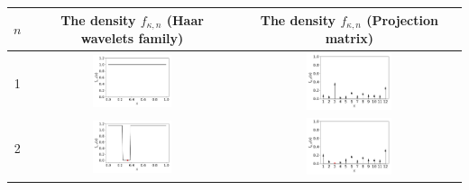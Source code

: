 \documentclass[twoside,11pt]{book}
\numberwithin{theorem}{chapter}
\numberwithin{definition}{chapter}
\numberwithin{proposition}{chapter}
\numberwithin{corollary}{chapter}
\numberwithin{example}{chapter}
\numberwithin{lemma}{chapter}
\numberwithin{assumption}{chapter}
\begin{document}
\begin{table}[]
\centering
 \begin{tabular}{| c| c| c|}
 \hline
  $n $ & The density $f_{\kappa,n}$ (Haar wavelets family) & The density $f_{\kappa,n}$ (Projection matrix)\\
 \hline
 1 & \includegraphics[width= 0.4\textwidth, height = 0.16\textheight]{img/Haar/haar_Ensemble_1D_conditional_N_0.pdf} & \includegraphics[width= 0.4\textwidth, height = 0.16\textheight]{img/discrete/discrete_Ensemble_1D_conditional_N_0.pdf}\\ 
 \hline
2 & \includegraphics[width= 0.4\textwidth, height = 0.16\textheight]{img/Haar/haar_Ensemble_1D_conditional_N_1.pdf} & \includegraphics[width= 0.4\textwidth, height = 0.16\textheight]{img/discrete/discrete_Ensemble_1D_conditional_N_1.pdf}\\
\hline

\end{tabular}
\end{table}
\end{document}
